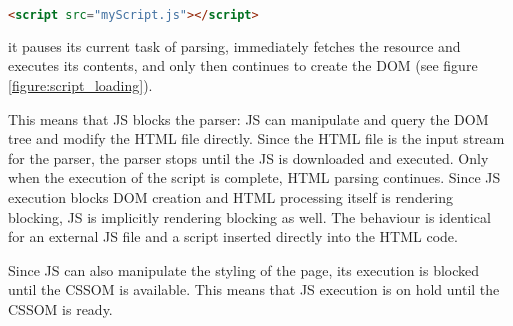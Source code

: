 \begin{lstlisting}[language=html, numbers=none]
<script src="myScript.js"></script>
\end{lstlisting}

it pauses its current task of parsing, immediately fetches the resource and executes its contents, and only then continues to create the DOM (see figure \ref{figure:script_loading}). %

This means that JS blocks the parser: JS can manipulate and query the DOM tree and modify the HTML file directly.
Since the HTML file is the input stream for the parser, the parser stops until the JS is downloaded and executed. %
Only when the execution of the script is complete, HTML parsing continues.
Since JS execution blocks DOM creation and HTML processing itself is rendering blocking, JS is implicitly rendering blocking as well. %
The behaviour is identical for an external JS file and a script inserted directly into the HTML code.









Since JS can also manipulate the styling of the page, its execution is blocked until the CSSOM is available.
This means that JS execution is on hold until the CSSOM is ready.

